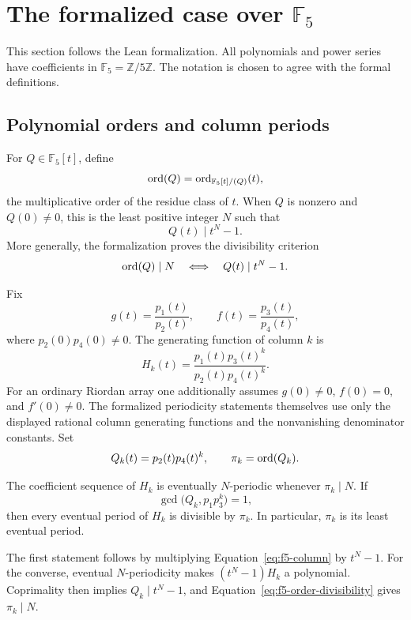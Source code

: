 \section{The formalized case over \texorpdfstring{$\mathbb F_5$}{F5}}

This section follows the Lean formalization. All polynomials and power series
have coefficients in $\mathbb F_5=\mathbb Z/5\mathbb Z$. The notation is
chosen to agree with the formal definitions.

\subsection{Polynomial orders and column periods}

For $Q\in\mathbb F_5[t]$, define
\[
\operatorname{ord}(Q)=\operatorname{ord}_{\mathbb F_5[t]/(Q)}(t),
\]
the multiplicative order of the residue class of $t$. When $Q$ is nonzero and
$Q(0)\ne0$, this is the least positive integer $N$ such that
\begin{equation}\label{eq:f5-order}
Q(t)\mid t^N-1.
\end{equation}
More generally, the formalization proves the divisibility criterion
\begin{equation}\label{eq:f5-order-divisibility}
\operatorname{ord}(Q)\mid N
\quad\Longleftrightarrow\quad
Q(t)\mid t^N-1.
\end{equation}

Fix
\[
g(t)=\frac{p_1(t)}{p_2(t)},
\qquad
f(t)=\frac{p_3(t)}{p_4(t)},
\]
where $p_2(0)p_4(0)\ne0$. The generating function of column $k$ is
\begin{equation}\label{eq:f5-column}
H_k(t)=\frac{p_1(t)p_3(t)^k}{p_2(t)p_4(t)^k}.
\end{equation}
For an ordinary Riordan array one additionally assumes $g(0)\ne0$,
$f(0)=0$, and $f'(0)\ne0$. The formalized periodicity statements themselves
use only the displayed rational column generating functions and the
nonvanishing denominator constants.
Set
\[
Q_k(t)=p_2(t)p_4(t)^k,
\qquad
\pi_k=\operatorname{ord}(Q_k).
\]

\begin{prop}\label{prop:f5-eventual}
The coefficient sequence of $H_k$ is eventually $N$-periodic whenever
$\pi_k\mid N$. If
\[
\gcd\bigl(Q_k,p_1p_3^k\bigr)=1,
\]
then every eventual period of $H_k$ is divisible by $\pi_k$. In particular,
$\pi_k$ is its least eventual period.
\end{prop}

The first statement follows by multiplying Equation~\eqref{eq:f5-column} by
$t^N-1$. For the converse, eventual $N$-periodicity makes
$(t^N-1)H_k$ a polynomial. Coprimality then implies
$Q_k\mid t^N-1$, and Equation~\eqref{eq:f5-order-divisibility} gives
$\pi_k\mid N$.

